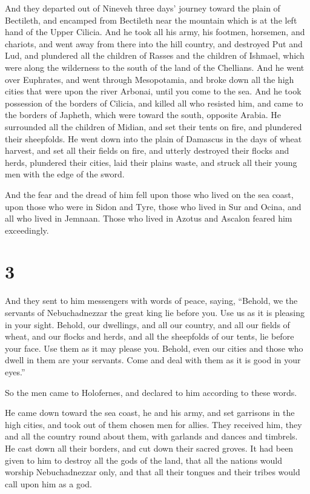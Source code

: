 And they departed out of Nineveh three days' journey
toward the plain of Bectileth, and encamped from Bectileth near the
mountain which is at the left hand of the Upper Cilicia. 
And he took all his army, his footmen, horsemen, and chariots, and went
away from there into the hill country,  and destroyed Put
and Lud, and plundered all the children of Rasses and the children of
Ishmael, which were along the wilderness to the south of the land of the
Chellians.  And he went over Euphrates, and went through
Mesopotamia, and broke down all the high cities that were upon the river
Arbonai, until you come to the sea.  And he took possession
of the borders of Cilicia, and killed all who resisted him, and came to
the borders of Japheth, which were toward the south, opposite Arabia.
 He surrounded all the children of Midian, and set their
tents on fire, and plundered their sheepfolds.  He went
down into the plain of Damascus in the days of wheat harvest, and set
all their fields on fire, and utterly destroyed their flocks and herds,
plundered their cities, laid their plains waste, and struck all their
young men with the edge of the sword.

 And the fear and the dread of him fell upon those who
lived on the sea coast, upon those who were in Sidon and Tyre, those who
lived in Sur and Ocina, and all who lived in Jemnaan. Those who lived in
Azotus and Ascalon feared him exceedingly.

\hypertarget{section-2}{%
\section{3}\label{section-2}}

 And they sent to him messengers with words of peace,
saying,  ``Behold, we the servants of Nebuchadnezzar the
great king lie before you. Use us as it is pleasing in your sight.
 Behold, our dwellings, and all our country, and all our
fields of wheat, and our flocks and herds, and all the sheepfolds of our
tents, lie before your face. Use them as it may please you. 
Behold, even our cities and those who dwell in them are your servants.
Come and deal with them as it is good in your eyes.''

 So the men came to Holofernes, and declared to him
according to these words.

 He came down toward the sea coast, he and his army, and set
garrisons in the high cities, and took out of them chosen men for
allies.  They received him, they and all the country round
about them, with garlands and dances and timbrels.  He cast
down all their borders, and cut down their sacred groves. It had been
given to him to destroy all the gods of the land, that all the nations
would worship Nebuchadnezzar only, and that all their tongues and their
tribes would call upon him as a god.

